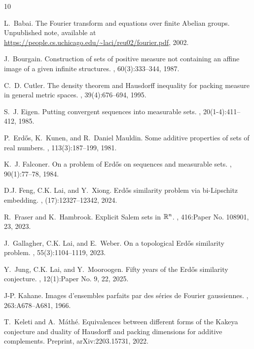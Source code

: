 \documentclass[12pt]{amsart}
\numberwithin{theorem}{section}
\numberwithin{equation}{section}
\begin{document}
\begin{thebibliography}{10}

L.~Babai.
\newblock The {F}ourier transform and equations over finite {A}belian groups.
\newblock Unpublished note, available at
  \url{https://people.cs.uchicago.edu/~laci/reu02/fourier.pdf}, 2002.

J.~Bourgain.
\newblock Construction of sets of positive measure not containing an affine
  image of a given infinite structures.
, 60(3):333--344, 1987.

C.~D. Cutler.
\newblock The density theorem and {H}ausdorff inequality for packing measure in
  general metric spaces.
, 39(4):676--694, 1995.

S.~J. Eigen.
\newblock Putting convergent sequences into measurable sets.
, 20(1-4):411--412, 1985.

P.~Erd\H{o}s, K.~Kunen, and R.~Daniel Mauldin.
\newblock Some additive properties of sets of real numbers.
, 113(3):187--199, 1981.

K.~J. Falconer.
\newblock On a problem of {E}rd{\H{o}}s on sequences and measurable sets.
, 90(1):77--78, 1984.

D.J. Feng, C.K. Lai, and Y.~Xiong.
\newblock Erd{\H{o}}s similarity problem via bi-{L}ipschitz embedding.
, (17):12327--12342, 2024.

R.~Fraser and K.~Hambrook.
\newblock Explicit {S}alem sets in {$\Bbb{R}^n$}.
, 416:Paper No. 108901, 23, 2023.

J.~Gallagher, C.K. Lai, and E.~Weber.
\newblock On a topological {E}rd{\H{o}}s similarity problem.
, 55(3):1104--1119, 2023.

Y.~Jung, C.K. Lai, and Y.~Mooroogen.
\newblock Fifty years of the {E}rd{\H{o}}s similarity conjecture.
, 12(1):Paper No. 9, 22, 2025.

J-P. Kahane.
\newblock Images d'ensembles parfaits par des s\'{e}ries de {F}ourier
  gaussiennes.
, 263:A678--A681, 1966.

T.~Keleti and A.~M\'{a}th\'{e}.
\newblock Equivalences between different forms of the {K}akeya conjecture and
  duality of {H}ausdorff and packing dimensions for additive complements.
\newblock Preprint, arXiv:2203.15731, 2022.


\end{thebibliography}
\end{document}

